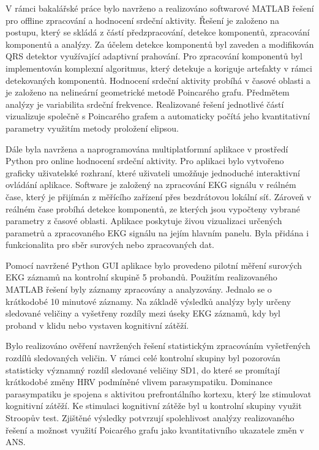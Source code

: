 V rámci bakalářské práce bylo navrženo a realizováno softwarové MATLAB
řešení pro offline zpracování a hodnocení srdeční aktivity. Řešení je založeno
na postupu, který se skládá z částí předzpracování, detekce komponentů,
zpracování komponentů a analýzy. Za účelem detekce komponentů byl zaveden a
modifikován QRS detektor využívající adaptivní prahování. Pro zpracování
komponentů byl implementován komplexní algoritmus, který detekuje a koriguje
artefakty v rámci detekovaných komponentů. Hodnocení srdeční aktivity probíhá v
časové oblasti a je založeno na nelineární geometrické metodě Poincarého grafu.
Předmětem analýzy je variabilita srdeční frekvence. Realizované řešení
jednotlivé částí vizualizuje společně s Poincarého grafem a automaticky počítá
jeho kvantitativní parametry využitím metody proložení elipsou. 

Dále byla navržena a naprogramována multiplatformní aplikace v prostředí Python
pro online hodnocení srdeční aktivity. Pro aplikaci bylo vytvořeno graficky
uživatelské rozhraní, které uživateli umožňuje jednoduché interaktivní ovládání
aplikace. Software je založený na zpracování EKG signálu v reálném čase, který
je přijímán z měřícího zařízení přes bezdrátovou lokální síť. Zároveň v reálném
čase probíhá detekce komponentů, ze kterých jsou vypočteny vybrané parametry 
z časové oblasti. Aplikace poskytuje živou vizualizaci určených parametrů a 
zpracovaného EKG signálu na jejím hlavním panelu. Byla přidána i funkcionalita 
pro sběr surových nebo zpracovaných dat.

Pomocí navržené Python GUI aplikace bylo provedeno pilotní měření surových EKG
záznamů na kontrolní skupině 5 probandů. Použitím realizovaného MATLAB řešení
byly záznamy zpracovány a analyzovány. Jednalo se o krátkodobé 10 minutové záznamy.
Na základě výsledků analýzy byly určeny sledované veličiny a vyšetřeny rozdíly mezi
úseky EKG záznamů, kdy byl proband v klidu nebo vystaven kognitivní zátěží. 

Bylo realizováno ověření navržených řešení statistickým zpracováním vyšetřených
rozdílů sledovaných veličin. V rámci celé kontrolní skupiny byl pozorován
statisticky významný rozdíl sledované veličiny SD1, do které se promítají
krátkodobé změny HRV podmíněné vlivem parasympatiku. Dominance parasympatiku je
spojena s aktivitou prefrontálního kortexu, který lze stimulovat kognitivní
zátěží. Ke stimulaci kognitivní zátěže byl u kontrolní skupiny využit Stroopův
test. Zjištěné výsledky potvrzují spolehlivost analýzy realizovaného řešení a
možnost využití Poicarého grafu jako kvantitativního ukazatele změn v ANS. 

